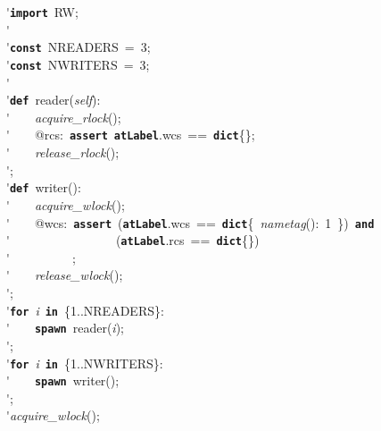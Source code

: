 \'\>\texttt{\textbf{import}}~RW;\\

\'\>\\

\'\>\texttt{\textbf{const}}~NREADERS~=~3;\\

\'\>\texttt{\textbf{const}}~NWRITERS~=~3;\\

\'\>\\

\'\>\texttt{\textbf{def}}~reader(\textit{self}):\\

\'\>~~~~\textit{acquire\_rlock}();\\

\'\>~~~~@rcs:~\texttt{\textbf{assert}}~\texttt{\textbf{atLabel}}.wcs~==~\texttt{\textbf{dict}}\{\};\\

\'\>~~~~\textit{release\_rlock}();\\

\'\>;\\

\'\>\texttt{\textbf{def}}~writer():\\

\'\>~~~~\textit{acquire\_wlock}();\\

\'\>~~~~@wcs:~\texttt{\textbf{assert}}~(\texttt{\textbf{atLabel}}.wcs~==~\texttt{\textbf{dict}}\{~\textit{nametag}():~1~\})~\texttt{\textbf{and}}\\

\'\>~~~~~~~~~~~~~~~~~(\texttt{\textbf{atLabel}}.rcs~==~\texttt{\textbf{dict}}\{\})\\

\'\>~~~~~~~~~~;\\

\'\>~~~~\textit{release\_wlock}();\\

\'\>;\\

\'\>\texttt{\textbf{for}}~\textit{i}~\texttt{\textbf{in}}~\{1..NREADERS\}:\\

\'\>~~~~\texttt{\textbf{spawn}}~reader(\textit{i});\\

\'\>;\\

\'\>\texttt{\textbf{for}}~\textit{i}~\texttt{\textbf{in}}~\{1..NWRITERS\}:\\

\'\>~~~~\texttt{\textbf{spawn}}~writer();\\

\'\>;\\

\'\>\textit{acquire\_wlock}();